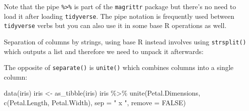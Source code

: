 \documentclass[
]{book}
\newenvironment{Shaded}{\begin{snugshade}}{\end{snugshade}}
\newcommand{\AttributeTok}[1]{\textcolor[rgb]{0.77,0.63,0.00}{#1}}
\newcommand{\CommentTok}[1]{\textcolor[rgb]{0.56,0.35,0.01}{\textit{#1}}}
\newcommand{\ConstantTok}[1]{\textcolor[rgb]{0.00,0.00,0.00}{#1}}
\newcommand{\ControlFlowTok}[1]{\textcolor[rgb]{0.13,0.29,0.53}{\textbf{#1}}}
\newcommand{\DecValTok}[1]{\textcolor[rgb]{0.00,0.00,0.81}{#1}}
\newcommand{\FunctionTok}[1]{\textcolor[rgb]{0.00,0.00,0.00}{#1}}
\newcommand{\NormalTok}[1]{#1}
\newcommand{\OtherTok}[1]{\textcolor[rgb]{0.56,0.35,0.01}{#1}}
\newcommand{\SpecialCharTok}[1]{\textcolor[rgb]{0.00,0.00,0.00}{#1}}
\newcommand{\StringTok}[1]{\textcolor[rgb]{0.31,0.60,0.02}{#1}}
\begin{document}
Note that the pipe \texttt{\%\textgreater{}\%} is part of the \texttt{magrittr} package but there's no need to load it after loading \texttt{tidyverse}. The pipe notation is frequently used between \texttt{tidyverse} verbs but you can also use it in some base R operations as well.

Separation of columns by strings, using base R instead involves using \texttt{strsplit()} which outputs a list and therefore we need to unpack it afterwards:

\begin{Shaded}
\end{Shaded}

The opposite of \texttt{separate()} is \texttt{unite()} which combines columns into a single column:

\begin{Shaded}
\begin{Highlighting}[]
\FunctionTok{data}\NormalTok{(iris)}
\NormalTok{iris }\OtherTok{\textless{}{-}} \FunctionTok{as\_tibble}\NormalTok{(iris)}
\NormalTok{iris }\SpecialCharTok{\%\textgreater{}\%} \FunctionTok{unite}\NormalTok{(}\StringTok{\textquotesingle{}Petal.Dimensions\textquotesingle{}}\NormalTok{, }\FunctionTok{c}\NormalTok{(}\StringTok{\textasciigrave{}}\AttributeTok{Petal.Length}\StringTok{\textasciigrave{}}\NormalTok{, }\StringTok{\textasciigrave{}}\AttributeTok{Petal.Width}\StringTok{\textasciigrave{}}\NormalTok{),}
               \AttributeTok{sep =} \StringTok{" x "}\NormalTok{, }\AttributeTok{remove =} \ConstantTok{FALSE}\NormalTok{)}
\end{Highlighting}
\end{Shaded}
\end{document}
